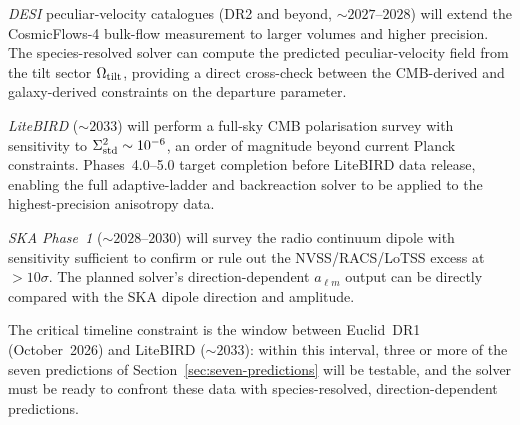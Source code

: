 \emph{DESI} peculiar-velocity catalogues (DR2 and
beyond, $\sim\!2027$--$2028$) will extend the
CosmicFlows-4 bulk-flow measurement to larger volumes
and higher precision.  The species-resolved solver can
compute the predicted peculiar-velocity field from the
tilt sector $\Omega_{\mathrm{tilt}}$, providing a direct cross-check
between the CMB-derived and galaxy-derived constraints on
the departure parameter.

\emph{LiteBIRD} ($\sim\!2033$) will perform a full-sky
CMB polarisation survey with sensitivity to
$\Sigma^2_{\mathrm{std}} \sim 10^{-6}$, an order of magnitude beyond
current Planck constraints.  Phases~4.0--5.0 target
completion before LiteBIRD data release, enabling the
full adaptive-ladder and backreaction solver to be applied
to the highest-precision anisotropy data.

\emph{SKA Phase~1} ($\sim\!2028$--$2030$) will survey
the radio continuum dipole with sensitivity sufficient to
confirm or rule out the NVSS/RACS/LoTSS excess at
$> 10\sigma$.  The planned solver's direction-dependent
$a_{\ell m}$ output can be directly compared with the
SKA dipole direction and amplitude.

The critical timeline constraint is the window between
Euclid~DR1 (October~2026) and LiteBIRD ($\sim\!2033$):
within this interval, three or more of the seven
predictions of Section~\ref{sec:seven-predictions} will be
testable, and the solver must be ready to confront these
data with species-resolved, direction-dependent
predictions.



